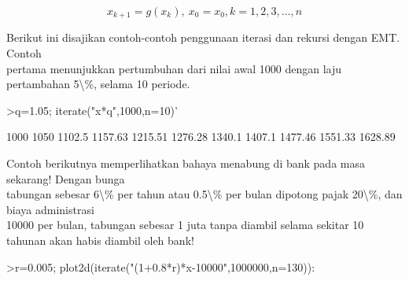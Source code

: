 \documentclass[12pt,arial,letterpaper]{book}
\begin{document}
\begin{eulernootebook}
\begin{eulercomment}
\begin{eulercomment}
\begin{eulernootebook}
\begin{eulercomment}
\begin{eulercomment}
\begin{eulercomment}
\begin{eulercomment}
\begin{eulercomment}
\begin{eulercomment}
\begin{eulernotebook}
\begin{eulercomment}
\begin{eulercomment}
\begin{eulercomment}
\begin{eulercomment}
\begin{eulercomment}
\begin{eulercomment}
\begin{eulercomment}
\begin{eulercomment}
\begin{eulercomment}
\begin{eulercomment}
\begin{eulercomment}
\begin{eulercomment}
\begin{eulercomment}
\begin{eulercomment}
\begin{eulercomment}
\begin{eulercomment}
\begin{eulercomment}
\begin{eulercomment}
\begin{eulercomment}
\begin{eulercomment}
\begin{eulercomment}
\begin{eulercomment}
\begin{eulercomment}
\begin{eulercomment}
\begin{eulercomment}
\begin{eulercomment}
\begin{eulercomment}
\end{eulercomment}
\begin{eulerformula}
\[
x_{k+1}=g(x_k), \ x_0=x_0, k= 1, 2, 3, ..., n
\]
\end{eulerformula}
\begin{eulercomment}
Berikut ini disajikan contoh-contoh penggunaan iterasi dan rekursi
dengan EMT. Contoh\\
pertama menunjukkan pertumbuhan dari nilai awal 1000 dengan laju
pertambahan 5\textbackslash{}\%, selama 10 periode.
\end{eulercomment}
\begin{eulerprompt}
>q=1.05; iterate("x*q",1000,n=10)'
\end{eulerprompt}
\begin{euleroutput}
           1000 
           1050 
         1102.5 
        1157.63 
        1215.51 
        1276.28 
         1340.1 
         1407.1 
        1477.46 
        1551.33 
        1628.89 
\end{euleroutput}
\begin{eulercomment}
Contoh berikutnya memperlihatkan bahaya menabung di bank pada masa
sekarang! Dengan bunga\\
tabungan sebesar 6\textbackslash{}\% per tahun atau 0.5\textbackslash{}\% per bulan dipotong pajak
20\textbackslash{}\%, dan biaya administrasi\\
10000 per bulan, tabungan sebesar 1 juta tanpa diambil selama sekitar
10 tahunan akan habis diambil oleh bank!
\end{eulercomment}
\begin{eulerprompt}
>r=0.005; plot2d(iterate("(1+0.8*r)*x-10000",1000000,n=130)):
\end{eulerprompt}

\end{eulercomment}
\end{eulercomment}
\end{eulercomment}
\end{eulercomment}
\end{eulercomment}
\end{eulercomment}
\end{eulercomment}
\end{eulercomment}
\end{eulercomment}
\end{eulercomment}
\end{eulercomment}
\end{eulercomment}
\end{eulercomment}
\end{eulercomment}
\end{eulercomment}
\end{eulercomment}
\end{eulercomment}
\end{eulercomment}
\end{eulercomment}
\end{eulercomment}
\end{eulercomment}
\end{eulercomment}
\end{eulercomment}
\end{eulercomment}
\end{eulercomment}
\end{eulercomment}
\end{eulernotebook}
\end{eulercomment}
\end{eulercomment}
\end{eulercomment}
\end{eulercomment}
\end{eulercomment}
\end{eulercomment}
\end{eulernootebook}
\end{eulercomment}
\end{eulercomment}
\end{eulernootebook}
\end{document}
